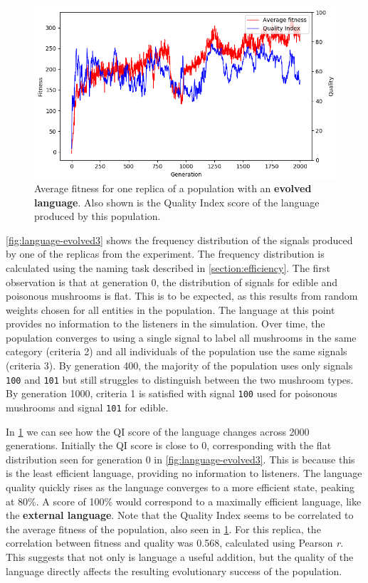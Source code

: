 \documentclass[12pt,a4paper]{report}
\begin{document}
\begin{figure}[t]
  \centering
  \includegraphics[width=.8\linewidth]{results/correlation.png}
 \caption{Average fitness for one replica of a population with an {\bf evolved language}. Also shown is the Quality Index score of the language produced by this population.}
  \label{fig:correlation}
\end{figure}

\cref{fig:language-evolved3} shows the frequency distribution of the signals produced by one of the replicas from the experiment. The frequency distribution is calculated using the naming task described in \cref{section:efficiency}. The first observation is that at generation 0, the distribution of signals for edible and poisonous mushrooms is flat. This is to be expected, as this results from random weights chosen for all entities in the population. The language at this point provides no information to the listeners in the simulation. Over time, the population converges to using a single signal to label all mushrooms in the same category (criteria 2) and all individuals of the population use the same signals (criteria 3). By generation 400, the majority of the population uses only signals \verb~100~ and \verb~101~ but still struggles to distinguish between the two mushroom types. By generation 1000, criteria 1 is satisfied with signal \verb~100~ used for poisonous mushrooms and signal \verb~101~ for edible. 

In \cref{fig:correlation} we can see how the QI score of the language changes across 2000 generations. Initially the QI score is close to 0, corresponding with the flat distribution seen for generation 0 in \cref{fig:language-evolved3}. This is because this is the least efficient language, providing no information to listeners. The language quality quickly rises as the language converges to a more efficient state, peaking at 80\%. A score of 100\% would correspond to a maximally efficient language, like the {\bf external language}. Note that the Quality Index seems to be correlated to the average fitness of the population, also seen in \cref{fig:correlation}. For this replica, the correlation between fitness and quality was 0.568, calculated using Pearson \emph{r}. This suggests that not only is language a useful addition, but the quality of the language directly affects the resulting evolutionary success of the population.
\end{document}
